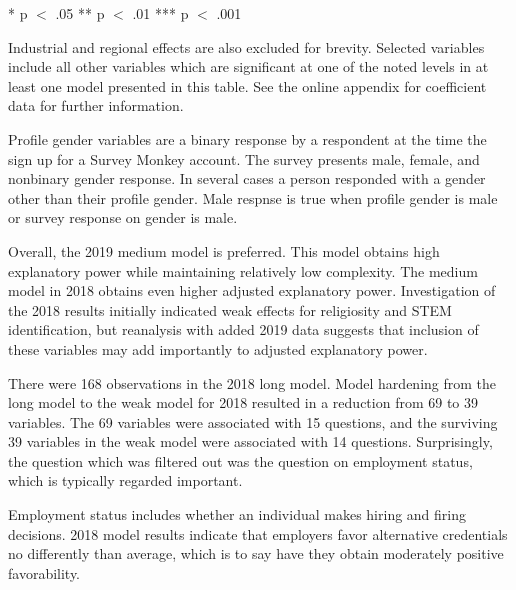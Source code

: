 \documentclass[AER]{./aea-latex-templates/AEA}
\begin{document}
\begin{table}
\begin{tabular}{lllll}
            \end{tabular}
            \begin{tablenotes}
                * p $<$ .05
                ** p $<$ .01
                *** p $<$ .001
                
                Industrial and regional effects are also excluded for brevity.
                Selected variables include all other variables which are significant at one of the noted levels in at least one model presented in this table.
                See the online appendix for coefficient data for further information.
            \end{tablenotes}
            \label{tab:models}
            \end{table}
        
        Profile gender variables are a binary response by a respondent at the time the sign up for a Survey Monkey account.
        The survey presents male, female, and nonbinary gender response. In several cases a person responded with a gender other than their profile gender.
        Male respnse is true when profile gender is male or survey response on gender is male.
        
        Overall, the 2019 medium model is preferred. This model obtains high explanatory power while maintaining relatively low complexity.
        The medium model in 2018 obtains even higher adjusted explanatory power.
        Investigation of the 2018 results initially indicated weak effects for religiosity and STEM identification,
        but reanalysis with added 2019 data suggests that inclusion of these variables may add importantly to adjusted explanatory power.
        
        There were 168 observations in the 2018 long model. Model hardening from
        the long model to the weak model for 2018 resulted in a reduction from 69
        to 39 variables. The 69 variables were associated with 15 questions, and
        the surviving 39 variables in the weak model were associated with 14
        questions. Surprisingly, the question which was filtered out
        was the question on employment status, which is typically regarded important.
        
        Employment status includes whether an individual makes hiring and firing decisions.
        2018 model results indicate that employers favor alternative credentials
        no differently than average, which is to say have they obtain moderately positive favorability.
        
\end{document}
